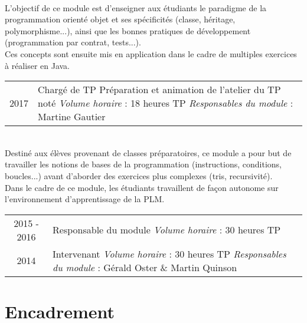 \documentclass[]{deedy-resume-openfont}
\begin{document}
\\
L'objectif de ce module est d'enseigner aux étudiants le paradigme de la programmation orienté objet et ses spécificités (classe, héritage, polymorphisme...),
ainsi que les bonnes pratiques de développement (programmation par contrat, tests...).
\\
Ces concepts sont ensuite mis en application dans le cadre de multiples exercices à réaliser en Java.
\\
\begin{tabular}{cp{125mm}}
2017            & Chargé de TP\newline
                  Préparation et animation de l'atelier du TP noté\newline
                  \emph{Volume horaire} : 18 heures TP\newline
                  \emph{Responsables du module} : Martine Gautier\\
\end{tabular}
\sectionsep

\\
Destiné aux élèves provenant de classes préparatoires, ce module a pour but de travailler les notions de bases de la programmation (instructions, conditions, boucles...) avant d'aborder des exercices plus complexes (tris, recursivité).
\\
Dans le cadre de ce module, les étudiants travaillent de façon autonome sur l'environnement d'apprentissage de la PLM.
\\
\begin{tabular}{cp{125mm}}
2015 - 2016       & Responsable du module\newline
                  \emph{Volume horaire} : 30 heures TP\\
2014            & Intervenant\newline
                  \emph{Volume horaire} : 30 heures TP\newline
                  \emph{Responsables du module} : Gérald Oster \& Martin Quinson\\
\end{tabular}
\sectionsep


\section{Encadrement}
\end{document}
